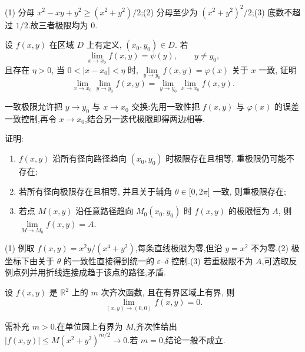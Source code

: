 \begin{solution}
    (1) 分母 $x^2-xy+y^2\geq(x^2+y^2)/2$;(2) 分母至少为 $(x^2+y^2)^2/2$;(3) 底数不超过 $1/2$.故三者极限均为 $0$.
\end{solution}

\begin{example}
    设 $f(x,y)$ 在区域 $D$ 上有定义, $(x_0,y_0)\in D$. 若
    \[
        \lim\limits_{x\to x_0}f(x,y)=\psi(y),\qquad y\ne y_0,
    \]
    且存在 $\eta>0$, 当 $0<|x-x_0|<\eta$ 时, $\displaystyle\lim\limits_{y\to y_0}f(x,y)=\varphi(x)$ 关于 $x$ 一致, 证明
    \[
        \lim\limits_{x\to x_0}\lim\limits_{y\to y_0}f(x,y)
        =\lim\limits_{y\to y_0}\lim\limits_{x\to x_0}f(x,y).
    \]
\end{example}
\exampleblank

\begin{solution}
    一致极限允许把 $y\to y_0$ 与 $x\to x_0$ 交换:先用一致性把 $f(x,y)$ 与 $\varphi(x)$ 的误差一致控制,再令 $x\to x_0$,结合另一迭代极限即得两边相等.
\end{solution}

\begin{example}[\markstar]
    证明:
    \begin{enumerate}
        \item $f(x,y)$ 沿所有径向路径趋向 $(x_0,y_0)$ 时极限存在且相等, 重极限仍可能不存在;
        \item 若所有径向极限存在且相等, 并且关于辅角 $\theta\in\lbrack0,2\pi\rbrack$ 一致, 则重极限存在;
        \item 若点 $M(x,y)$ 沿任意路径趋向 $M_0(x_0,y_0)$ 时 $f(x,y)$ 的极限恒为 $A$, 则 $\displaystyle\lim\limits_{M\to M_0}f(x,y)=A$.
    \end{enumerate}
\end{example}
\exampleblank

\begin{solution}
    (1) 例取 $f(x,y)=x^2y/(x^4+y^2)$,每条直线极限为零,但沿 $y=x^2$ 不为零.(2) 极坐标下由关于 $\theta$ 的一致性直接得到统一的 $\varepsilon$--$\delta$ 控制.(3) 若重极限不为 $A$,可选取反例点列并用折线连接成趋于该点的路径,矛盾.
\end{solution}

\begin{example}
    设 $f(x,y)$ 是 $\mathbb{R}^2$ 上的 $m$ 次齐次函数, 且在有界区域上有界, 则
    \[
        \lim\limits_{(x,y)\to(0,0)}f(x,y)=0.
    \]
\end{example}
\exampleblank

\begin{solution}
    需补充 $m>0$.在单位圆上有界为 $M$,齐次性给出 $|f(x,y)|\leq M(x^2+y^2)^{m/2}\to0$.若 $m=0$,结论一般不成立.
\end{solution}

